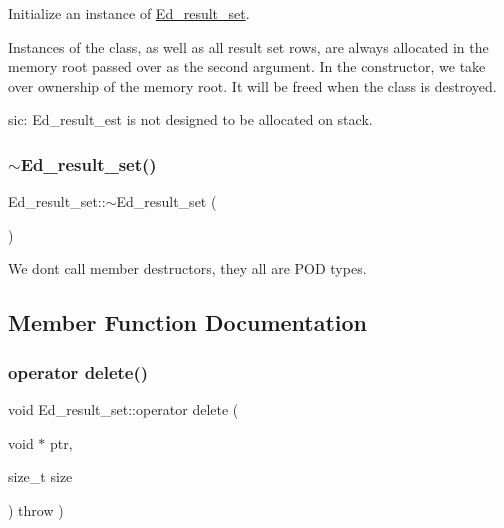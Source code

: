 Initialize an instance of \mbox{\hyperlink{classEd__result__set}{Ed\+\_\+result\+\_\+set}}.

Instances of the class, as well as all result set rows, are always allocated in the memory root passed over as the second argument. In the constructor, we take over ownership of the memory root. It will be freed when the class is destroyed.

sic\+: Ed\+\_\+result\+\_\+est is not designed to be allocated on stack. \mbox{\label{classEd__result__set_aa1b5f342e1cecd455b506d6b30738d4a}} 
\subsubsection{\texorpdfstring{$\sim$\+Ed\+\_\+result\+\_\+set()}{~Ed\_result\_set()}}
{\footnotesize\ttfamily Ed\+\_\+result\+\_\+set\+::$\sim$\+Ed\+\_\+result\+\_\+set (\begin{DoxyParamCaption}{ }\end{DoxyParamCaption})\hspace{0.3cm}{\ttfamily [inline]}}

We don\textquotesingle{}t call member destructors, they all are P\+OD types. 

\subsection{Member Function Documentation}
\mbox{\label{classEd__result__set_a81f3670478a727c2747d61d680e851fe}} 
\subsubsection{\texorpdfstring{operator delete()}{operator delete()}}
{\footnotesize\ttfamily void Ed\+\_\+result\+\_\+set\+::operator delete (\begin{DoxyParamCaption}\item[{void $\ast$}]{ptr,  }\item[{size\+\_\+t}]{size }\end{DoxyParamCaption}) throw  ) \hspace{0.3cm}{\ttfamily [static]}}

